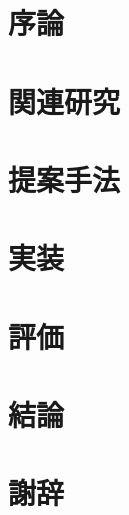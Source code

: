 \documentclass[12pt]{m-thesis}
\begin{document}





\pagestyle{headings}
\setcounter{page}{1}

\chapter{序論}
\label{chap:intro}


\chapter{関連研究}
\label{chap:related_work}


\chapter{提案手法}
\label{chap:design}


\chapter{実装}
\label{chap:implement}


\chapter{評価}
\label{chap:eval}


\chapter{結論}
\label{chap:conclusion}





\chapter*{謝辞}
\label{chap:acknowledgments}


% 
\end{document}
